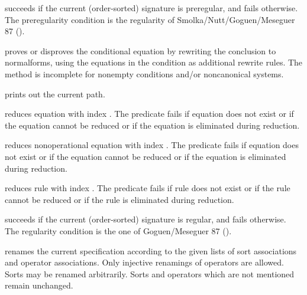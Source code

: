 \begin{command}
succeeds if the current (order-sorted) signature is preregular,
and fails otherwise.
The preregularity condition is the regularity of 
Smolka/Nutt/Goguen/Meseguer 87 ( \cite{SNGM87}).
\end{command}


\begin{command}
proves or disproves the conditional equation  by 
rewriting the conclusion to normalforms, using the equations in the 
condition as additional rewrite rules. The method is incomplete for
nonempty conditions and/or noncanonical systems.
\end{command}

\begin{command}
prints out the current path.
\end{command}

\begin{command}
reduces equation with index . 
The predicate fails if equation  does
not exist or if the equation cannot be reduced or if the equation is eliminated
during reduction.
\end{command}

\begin{command}
reduces nonoperational equation with index . 
The predicate fails if equation
 does not exist or if the equation cannot be reduced or if the 
equation is eliminated during reduction.
\end{command}
 
\begin{command}
reduces rule with index . The predicate fails if rule 
 does not
exist or if the rule cannot be reduced or if the rule is eliminated during 
reduction.
\end{command}

\begin{command}
succeeds if the current (order-sorted) signature is regular,
and fails otherwise.
The regularity condition is the one of Goguen/Meseguer 87
( \cite{GM87}).
\end{command}

\begin{command}
renames the current specification according to the given lists of sort associations
and operator associations. Only injective renamings of operators are allowed.
Sorts may be renamed arbitrarily. Sorts and operators which are not mentioned remain 
unchanged.
\end{command}

